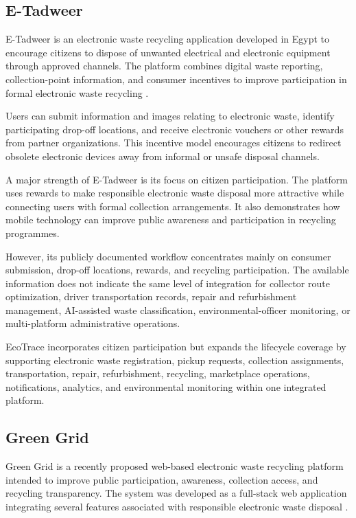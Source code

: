 \subsection{E-Tadweer}

E-Tadweer is an electronic waste recycling application developed in Egypt to
encourage citizens to dispose of unwanted electrical and electronic equipment
through approved channels. The platform combines digital waste reporting,
collection-point information, and consumer incentives to improve participation in
formal electronic waste recycling \citep{etadweer2026}.

Users can submit information and images relating to electronic waste, identify
participating drop-off locations, and receive electronic vouchers or other rewards
from partner organizations. This incentive model encourages citizens to redirect
obsolete electronic devices away from informal or unsafe disposal channels.

A major strength of E-Tadweer is its focus on citizen participation. The
platform uses rewards to make responsible electronic waste disposal more
attractive while connecting users with formal collection arrangements. It also
demonstrates how mobile technology can improve public awareness and
participation in recycling programmes.

However, its publicly documented workflow concentrates mainly on consumer
submission, drop-off locations, rewards, and recycling participation. The available
information does not indicate the same level of integration for collector route
optimization, driver transportation records, repair and refurbishment
management, AI-assisted waste classification, environmental-officer monitoring,
or multi-platform administrative operations.

EcoTrace incorporates citizen participation but expands the lifecycle coverage
by supporting electronic waste registration, pickup requests, collection
assignments, transportation, repair, refurbishment, recycling, marketplace
operations, notifications, analytics, and environmental monitoring within one
integrated platform.

\subsection{Green Grid}

Green Grid is a recently proposed web-based electronic waste recycling platform
intended to improve public participation, awareness, collection access, and
recycling transparency. The system was developed as a full-stack web application
integrating several features associated with responsible electronic waste disposal
\citep{jagtap2026}.

